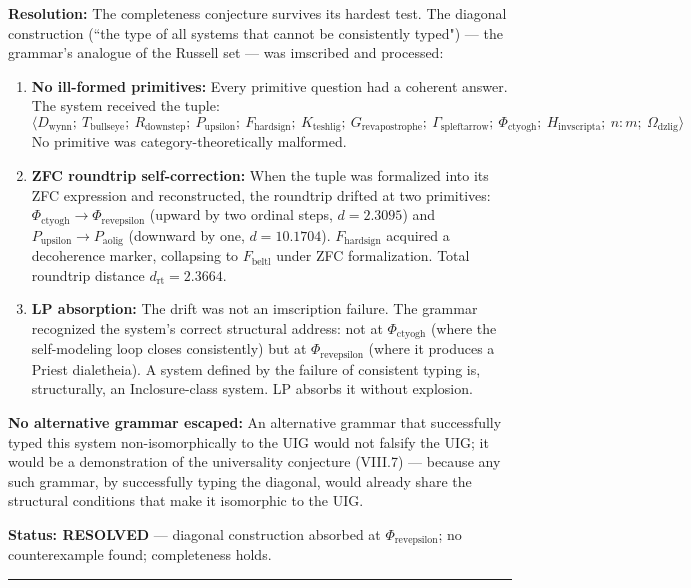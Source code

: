 \documentclass[12pt,a4paper]{article}
\begin{document}
\textbf{Resolution:} The completeness conjecture survives its hardest test. The diagonal construction (``the type of all systems that cannot be consistently typed") --- the grammar's analogue of the Russell set --- was imscribed and processed:
\begin{enumerate}
\item \textbf{No ill-formed primitives:} Every primitive question had a coherent answer. The system received the tuple:
$$\langle D_{\text{wynn}};\ T_{\text{bullseye}};\ R_{\text{downstep}};\ P_{\text{upsilon}};\ F_{\text{hardsign}};\ K_{\text{teshlig}};\ G_{\text{revapostrophe}};\ \Gamma_{\text{spleftarrow}};\ \Phi_{\text{ctyogh}};\ H_{\text{invscripta}};\ n{:}m;\ \Omega_{\text{dzlig}} \rangle$$
No primitive was category-theoretically malformed.
\item \textbf{ZFC roundtrip self-correction:} When the tuple was formalized into its ZFC expression and reconstructed, the roundtrip drifted at two primitives: $\Phi_{\text{ctyogh}} \to \Phi_{\text{revepsilon}}$ (upward by two ordinal steps, $d = 2.3095$) and $P_{\text{upsilon}} \to P_{\text{aolig}}$ (downward by one, $d = 10.1704$). $F_{\text{hardsign}}$ acquired a decoherence marker, collapsing to $F_{\text{beltl}}$ under ZFC formalization. Total roundtrip distance $d_\text{rt} = 2.3664$.
\item \textbf{LP absorption:} The drift was not an imscription failure. The grammar recognized the system's correct structural address: not at $\Phi_{\text{ctyogh}}$ (where the self-modeling loop closes consistently) but at $\Phi_{\text{revepsilon}}$ (where it produces a Priest dialetheia). A system defined by the failure of consistent typing is, structurally, an Inclosure-class system. LP absorbs it without explosion.
\end{enumerate}

\textbf{No alternative grammar escaped:} An alternative grammar that successfully typed this system non-isomorphically to the UIG would not falsify the UIG; it would be a demonstration of the universality conjecture (VIII.7) --- because any such grammar, by successfully typing the diagonal, would already share the structural conditions that make it isomorphic to the UIG.

\textbf{Status: RESOLVED} --- diagonal construction absorbed at $\Phi_{\text{revepsilon}}$; no counterexample found; completeness holds.

\begin{center}
\rule{0.5\textwidth}{0.4pt}
\end{center}
\end{document}
